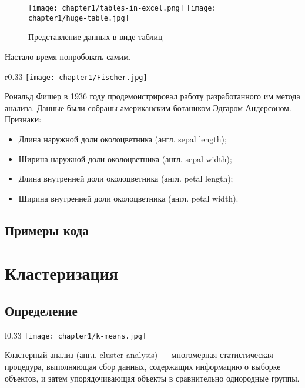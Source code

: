 \begin{figure}[H]
    \centering    
    \texttt{[image: chapter1/tables-in-excel.png]}    
    \texttt{[image: chapter1/huge-table.jpg]} %
    \caption{Представление данных в виде таблиц}
    \label{tables-representation}
\end{figure}

Настало время попробовать самим. 

\begin{wrapfigure}{r}{0.33\textwidth}
    \vspace{-0.5cm}
    \texttt{[image: chapter1/Fischer.jpg]}
\end{wrapfigure}
Рональд Фишер в 1936 году продемонстрировал работу разработанного им метода анализа. Данные были собраны американским ботаником Эдгаром Андерсоном. \\

Признаки:
\begin{itemize}
    \item Длина наружной доли околоцветника (англ. sepal length);
    \item Ширина наружной доли околоцветника (англ. sepal width);
    \item Длина внутренней доли околоцветника (англ. petal length);
    \item Ширина внутренней доли околоцветника (англ. petal width).
\end{itemize}

\subsection{Примеры кода}

\section{Кластеризация}
\subsection{Определение}

\begin{wrapfigure}{l}{0.33\textwidth}
    \vspace{-0.5cm}
    \texttt{[image: chapter1/k-means.jpg]}
\end{wrapfigure}
Кластерный анализ (англ. cluster analysis) — многомерная статистическая процедура, выполняющая сбор данных, содержащих информацию о выборке объектов, и затем упорядочивающая объекты в сравнительно однородные группы.\cite{wiki:clustering_def}

